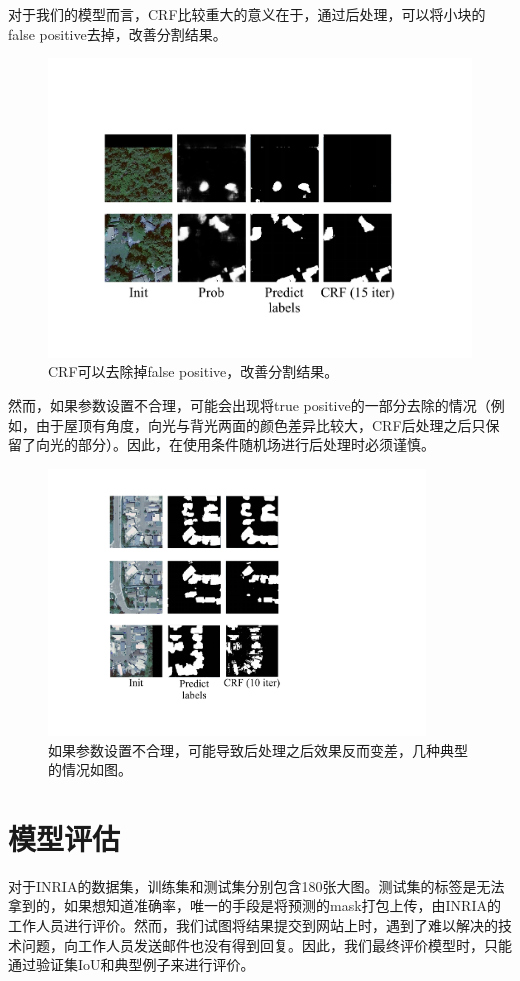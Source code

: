 \documentclass[a4paper,12pt]{article}
\begin{document}
\begin{CJK*}{UTF8}{gbsn}
\begin{spacing}{1.2}
    对于我们的模型而言，CRF比较重大的意义在于，通过后处理，可以将小块的false positive去掉，改善分割结果。
    \begin{figure} [!]
    \centering
    \includegraphics[width=14.0cm]{CRF_2.pdf}
    \caption{CRF可以去除掉false positive，改善分割结果。}
    \label{fig:Fig 2}
    \end{figure}
    然而，如果参数设置不合理，可能会出现将true positive的一部分去除的情况（例如，由于屋顶有角度，向光与背光两面的颜色差异比较大，CRF后处理之后只保留了向光的部分）。因此，在使用条件随机场进行后处理时必须谨慎。
    \begin{figure} [!]
    \centering
    \includegraphics[width=10.0cm]{CRF_3.pdf}
    \caption{如果参数设置不合理，可能导致后处理之后效果反而变差，几种典型的情况如图。}
    \label{fig:Fig 3}
    \end{figure}



    
    \section{模型评估}
    对于INRIA的数据集，训练集和测试集分别包含180张大图。测试集的标签是无法拿到的，如果想知道准确率，唯一的手段是将预测的mask打包上传，由INRIA的工作人员进行评价。然而，我们试图将结果提交到网站上时，遇到了难以解决的技术问题，向工作人员发送邮件也没有得到回复。因此，我们最终评价模型时，只能通过验证集IoU和典型例子来进行评价。

\end{spacing}
\end{CJK*}
\end{document}
